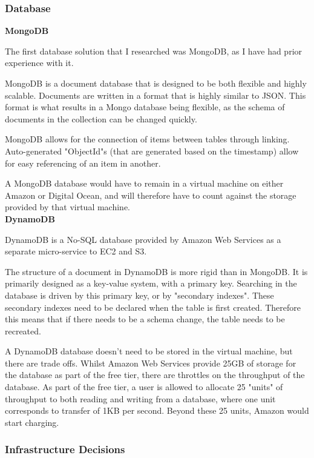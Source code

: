 \documentclass[12pt]{article}
\begin{document}
\subsubsection{Database}

\textbf{MongoDB}

The first database solution that I researched was MongoDB, as I have had prior experience with it. 

MongoDB is a document database that is designed to be both flexible and highly scalable. Documents are written in a format that is highly similar to JSON. This format is what results in a Mongo database being flexible, as the schema of documents in the collection can be changed quickly. 

MongoDB allows for the connection of items between tables through linking. Auto-generated "ObjectId"s (that are generated based on the timestamp) allow for easy referencing of an item in another.

A MongoDB database would have to remain in a virtual machine on either Amazon or Digital Ocean, and will therefore have to count against the storage provided by that virtual machine. \\

\textbf{DynamoDB}

DynamoDB is a No-SQL database provided by Amazon Web Services as a separate micro-service to EC2 and S3. 

The structure of a document in DynamoDB is more rigid than in MongoDB. It is primarily designed as a key-value system, with a primary key. Searching in the database is driven by this primary key, or by "secondary indexes". These secondary indexes need to be declared when the table is first created. Therefore this means that if there needs to be a schema change, the table needs to be recreated.

A DynamoDB database doesn't need to be stored in the virtual machine, but there are trade offs. Whilst Amazon Web Services provide 25GB of storage for the database as part of the free tier, there are throttles on the throughput of the database. As part of the free tier, a user is allowed to allocate 25 "units" of throughput to both reading and writing from a database, where one unit corresponds to transfer of 1KB per second. Beyond these 25 units, Amazon would start charging.

\subsubsection{Infrastructure Decisions}
\end{document}
